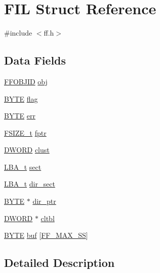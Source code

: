 \hypertarget{structFIL}{}\section{F\+IL Struct Reference}
\label{structFIL}


{\ttfamily \#include $<$ff.\+h$>$}

\subsection*{Data Fields}
\begin{DoxyCompactItemize}
\item 
\hyperlink{structFFOBJID}{F\+F\+O\+B\+J\+ID} \hyperlink{structFIL_ad95b6e85106673b0d7a1855da4d264f4}{obj}
\item 
\hyperlink{ff_8h_a4ae1dab0fb4b072a66584546209e7d58}{B\+Y\+TE} \hyperlink{structFIL_ac409508881f5a16f2998ae675072b376}{flag}
\item 
\hyperlink{ff_8h_a4ae1dab0fb4b072a66584546209e7d58}{B\+Y\+TE} \hyperlink{structFIL_aea440945db26de9c4a88065c0c887fda}{err}
\item 
\hyperlink{ff_8h_a3fc0992ad7436250b6b1a0592214b7f2}{F\+S\+I\+Z\+E\+\_\+t} \hyperlink{structFIL_a088b03ab2e02f82e10e17bdd938190a6}{fptr}
\item 
\hyperlink{ff_8h_ad342ac907eb044443153a22f964bf0af}{D\+W\+O\+RD} \hyperlink{structFIL_aa41312aba551b9a6d1c9d3c8c7d2734b}{clust}
\item 
\hyperlink{ff_8h_a1f3c30a83148a28340f009d4e583f087}{L\+B\+A\+\_\+t} \hyperlink{structFIL_aa3f9f9ed9341b765862d073a95c86001}{sect}
\item 
\hyperlink{ff_8h_a1f3c30a83148a28340f009d4e583f087}{L\+B\+A\+\_\+t} \hyperlink{structFIL_a19e61b116df8e6f2138243998e43f131}{dir\+\_\+sect}
\item 
\hyperlink{ff_8h_a4ae1dab0fb4b072a66584546209e7d58}{B\+Y\+TE} $\ast$ \hyperlink{structFIL_a5af9e9fb312b629220eaf684dd28c4a9}{dir\+\_\+ptr}
\item 
\hyperlink{ff_8h_ad342ac907eb044443153a22f964bf0af}{D\+W\+O\+RD} $\ast$ \hyperlink{structFIL_a28a30613d48cefcf9efbd334cd861fc8}{cltbl}
\item 
\hyperlink{ff_8h_a4ae1dab0fb4b072a66584546209e7d58}{B\+Y\+TE} \hyperlink{structFIL_ac2aa36f0fa61cd82f905173d51f719b0}{buf} \mbox{[}\hyperlink{ffconf_8h_a104c36ee46f9d6e76dadf37f3d9696cc}{F\+F\+\_\+\+M\+A\+X\+\_\+\+SS}\mbox{]}
\end{DoxyCompactItemize}


\subsection{Detailed Description}


